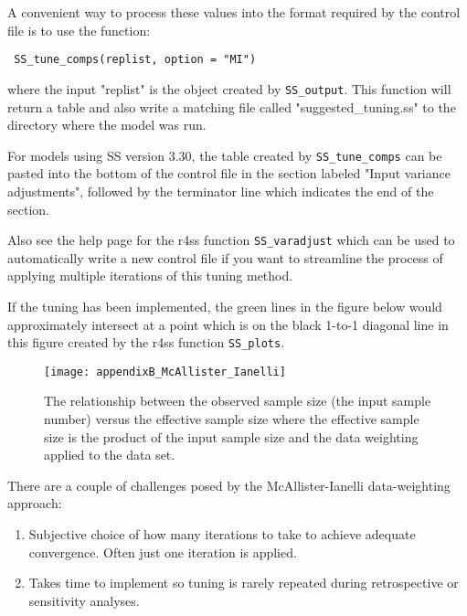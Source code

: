 A convenient way to process these values into the format required by the control file is to use the function:

\texttt{ SS\_tune\_comps(replist, option = "MI") }

where the input "replist" is the object created by \texttt{SS\_output}. This function will return a table and also write a matching file called "suggested\_tuning.ss" to the directory where the model was run.

For models using SS version 3.30, the table created by \texttt{SS\_tune\_comps} can be pasted into the bottom of the control file in the section labeled "Input variance adjustments", followed by the terminator line which indicates the end of the section. 



Also see the help page for the r4ss function \texttt{SS\_varadjust} which can be used to automatically write a new control file if you want to streamline the process of applying multiple iterations of this tuning method.

If the tuning has been implemented, the green lines in the figure below would approximately intersect at a point which is on the black 1-to-1 diagonal line in this figure created by the r4ss function \texttt{SS\_plots}.

\begin{figure}[h]
	\begin{center}
		\texttt{[image: appendixB\_McAllister\_Ianelli]}\\
	\end{center}

	\caption{ The relationship between the observed sample size (the input sample number) versus the effective sample size where the effective sample size is the product of the input sample size and the data weighting applied to the data set. }
	\label{(fig:mcallister)}
\end{figure}

There are a couple of challenges posed by the McAllister-Ianelli data-weighting approach:
\begin{enumerate}
	\item Subjective choice of how many iterations to take to achieve adequate convergence. Often just one iteration is applied.
	
	\item Takes time to implement so tuning is rarely repeated during retrospective or sensitivity analyses.
\end{enumerate}

